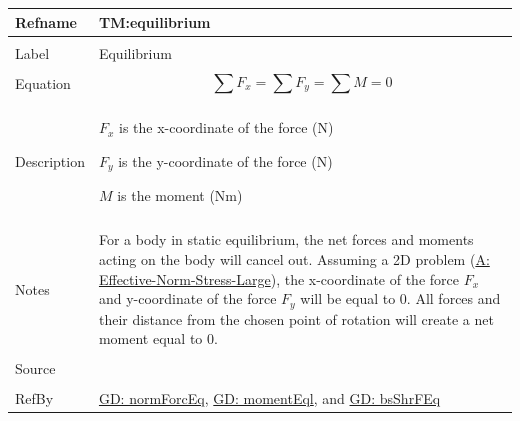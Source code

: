 \documentclass[12pt]{article}
\begin{document}
\noindent \begin{minipage}{\textwidth}
          \begin{tabular}{>{\raggedright}p{}>{\raggedright\arraybackslash}p{}}
          \toprule \textbf{Refname} & \textbf{TM:equilibrium}
          \label{TM:equilibrium}
          \\ \midrule \\
          Label & Equilibrium
          \\ \midrule \\
          Equation & \begin{displaymath}
                     \displaystyle\sum{{F_{x}}}=\displaystyle\sum{{F_{y}}}=\displaystyle\sum{M}=0
                     \end{displaymath}
          \\ \midrule \\
          Description & \begin{symbDescription}
                        \item{${F_{x}}$ is the x-coordinate of the force (N)}
                        \item{${F_{y}}$ is the y-coordinate of the force (N)}
                        \item{$M$ is the moment (Nm)}
                        \end{symbDescription}
          \\ \midrule \\
          Notes & For a body in static equilibrium, the net forces and moments acting on the body will cancel out. Assuming a 2D problem (\hyperref[assumpENSL]{A: Effective-Norm-Stress-Large}), the x-coordinate of the force ${F_{x}}$ and y-coordinate of the force ${F_{y}}$ will be equal to $0$. All forces and their distance from the chosen point of rotation will create a net moment equal to $0$.
          \\ \midrule \\
          Source & \cite{fredlund1977}
          \\ \midrule \\
          RefBy & \hyperref[GD:normForcEq]{GD: normForcEq}, \hyperref[GD:momentEql]{GD: momentEql}, and \hyperref[GD:bsShrFEq]{GD: bsShrFEq}
          \\ \bottomrule
          \end{tabular}
          \end{minipage}
\par~
\end{document}
